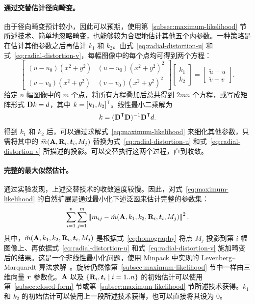 \paragraph{通过交替估计径向畸变。}
由于径向畸变预计较小，因此可以预期，使用第~\ref{subsec:maximum-likelihood} 节所述技术、简单地忽略畸变，也能够较为合理地估计其他五个内参数。一种策略是在估计其他参数之后再估计 $k_1$ 和 $k_2$。由式~\eqref{eq:radial-distortion-u} 和式~\eqref{eq:radial-distortion-v}，每幅图像中的每个点均可得到两个方程：
\begin{equation*}
\begin{bmatrix}
(u-u_0)(x^2+y^2) & (u-u_0)(x^2+y^2)^2\\
(v-v_0)(x^2+y^2) & (v-v_0)(x^2+y^2)^2
\end{bmatrix}
\begin{bmatrix}k_1\\k_2\end{bmatrix}
=
\begin{bmatrix}\breve{u}-u\\\breve{v}-v\end{bmatrix} .
\end{equation*}
给定 $n$ 幅图像中的 $m$ 个点，将所有方程叠加后总共得到 $2mn$ 个方程，或写成矩阵形式 $\mathbf{D}k=d$，其中 $k=[k_1,k_2]^{\mathsf{T}}$。线性最小二乘解为
\begin{equation}
k=(\mathbf{D}^{\mathsf{T}}\mathbf{D})^{-1}\mathbf{D}^{\mathsf{T}}d .
\label{eq:radial-linear-least-squares}
\end{equation}
得到 $k_1$ 和 $k_2$ 后，可以通过求解式~\eqref{eq:maximum-likelihood} 来细化其他参数，只需将其中的 $\widehat{m}(\mathbf{A},\mathbf{R}_i,\boldsymbol{t}_i,M_j)$ 替换为式~\eqref{eq:radial-distortion-u} 和式~\eqref{eq:radial-distortion-v} 所描述的投影。可以交替执行这两个过程，直到收敛。

\paragraph{完整的最大似然估计。}
通过实验发现，上述交替技术的收敛速度较慢。因此，对式~\eqref{eq:maximum-likelihood} 的自然扩展是通过最小化下述泛函来估计完整的参数集：
\begin{equation}
\sum_{i=1}^{n}\sum_{j=1}^{m}
\left\lVert m_{ij}-\breve{m}(\mathbf{A},k_1,k_2,\mathbf{R}_i,\boldsymbol{t}_i,M_j)\right\rVert^2 .
\label{eq:complete-maximum-likelihood}
\end{equation}
其中，$\breve{m}(\mathbf{A},k_1,k_2,\mathbf{R}_i,\boldsymbol{t}_i,M_j)$ 是根据式~\eqref{eq:homography} 将点 $M_j$ 投影到第 $i$ 幅图像上、再依据式~\eqref{eq:radial-distortion-u} 和式~\eqref{eq:radial-distortion-v} 施加畸变后的结果。这是一个非线性最小化问题，使用 Minpack 中实现的 Levenberg--Marquardt 算法求解~\cite{more1977levenberg}。旋转仍然像第~\ref{subsec:maximum-likelihood} 节中一样由三维向量 $\boldsymbol{r}$ 参数化。$\mathbf{A}$ 以及 $\{\mathbf{R}_i,\boldsymbol{t}_i\mid i=1..n\}$ 的初始估计可以使用第~\ref{subsec:closed-form} 节或第~\ref{subsec:maximum-likelihood} 节所述技术获得。$k_1$ 和 $k_2$ 的初始估计可以使用上一段所述技术获得，也可以直接将其设为 $0$。

